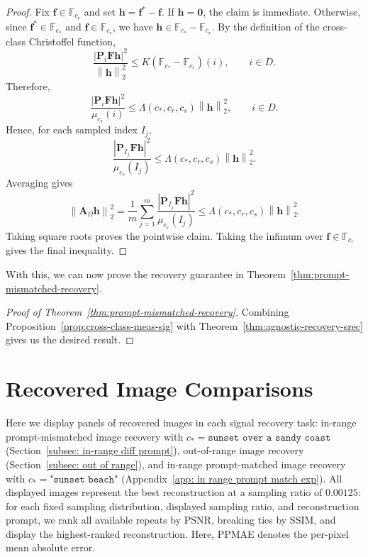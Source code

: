 \documentclass{article}
\theoremstyle{plain}
\theoremstyle{definition}
\theoremstyle{remark}
\begin{document}
\begin{proof}
  Fix $\mathbf f\in\mathbb F_{c_r}$ and set
  $
    \mathbf h=\mathbf f^*-\mathbf f.
  $
  If $\mathbf h=\mathbf 0$, the claim is immediate. Otherwise,
  since $\mathbf f^*\in\mathbb F_{c_*}$ and $\mathbf f\in\mathbb F_{c_r}$,
  we have
  $
    \mathbf h\in \mathbb F_{c_*}-\mathbb F_{c_r}.
  $
  By the definition of the cross-class Christoffel function,
  \[
    \frac{\left|\mathbf P_i\mathbf F\mathbf h\right|^2}
    {\left\|\mathbf h\right\|_2^2}
    \leq
    K\left(\mathbb F_{c_*}-\mathbb F_{c_r}\right)(i),
    \qquad i\in D.
  \]
  Therefore,
  \[
    \frac{\left|\mathbf P_i\mathbf F\mathbf h\right|^2}
    {\mu_{c_s}(i)}
    \leq
    \Lambda(c_*,c_r,c_s)\left\|\mathbf h\right\|_2^2,
    \qquad i\in D.
  \]
  Hence, for each sampled index $I_j$,
  \[
    \frac{\left|\mathbf P_{I_j}\mathbf F\mathbf h\right|^2}
    {\mu_{c_s}(I_j)}
    \leq
    \Lambda(c_*,c_r,c_s)\left\|\mathbf h\right\|_2^2.
  \]
  Averaging gives
  \[
    \left\|\mathbf A_\Omega\mathbf h\right\|_2^2
    =
    \frac{1}{m}
    \sum_{j=1}^m
    \frac{\left|\mathbf P_{I_j}\mathbf F\mathbf h\right|^2}
    {\mu_{c_s}(I_j)}
    \leq
    \Lambda(c_*,c_r,c_s)\left\|\mathbf h\right\|_2^2.
  \]
  Taking square roots proves the pointwise claim. Taking the infimum over
  $\mathbf f\in\mathbb F_{c_r}$ gives the final inequality.
\end{proof}

With this, we can now prove the recovery guarantee in Theorem~\ref{thm:prompt-mismatched-recovery}.
\begin{proof}[Proof of Theorem~\ref{thm:prompt-mismatched-recovery}]
  Combining Proposition~\ref{prop:cross-class-meas-sig} with Theorem~\ref{thm:agnostic-recovery-srec} gives us the desired result.
\end{proof}

\newpage\section{Recovered Image Comparisons}\label{app: recovered img comp}
Here we display panels of recovered images in each signal recovery task: in-range prompt-mismatched image recovery with  $c_* = \texttt{sunset over a sandy coast}$ (Section~\ref{subsec: in-range diff prompt}), out-of-range image recovery (Section~\ref{subsec: out of range}), and in-range prompt-matched image recovery with  $c_* = \texttt{"sunset beach"}$ (Appendix~\ref{app: in range prompt match exp}). All displayed images represent the best reconstruction at a sampling ratio of $0.00125$: for each fixed sampling distribution, displayed sampling ratio, and reconstruction prompt, we rank all available repeats by PSNR, breaking ties by SSIM, and display the highest-ranked reconstruction. Here, PPMAE denotes the per-pixel mean absolute error. 
\end{document}
